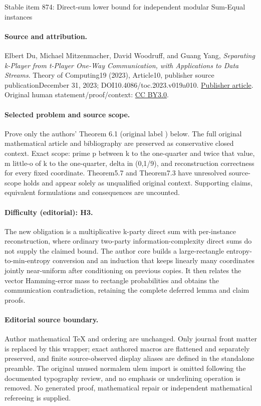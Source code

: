 \documentclass[11pt]{article}
\numberwithin{equation}{section}
\theoremstyle{definition}
\theoremstyle{plain}
\begin{document}
\begin{center}{\Large Stable item 874: Direct-sum lower bound for independent modular Sum-Equal instances}\end{center}
\paragraph{Source and attribution.}
Elbert Du, Michael Mitzenmacher, David Woodruff, and Guang Yang, \emph{Separating k-Player from t-Player One-Way Communication, with Applications to Data Streams}. Theory of Computing19 (2023), Article10, publisher source publicationDecember 31, 2023; DOI10.4086/toc.2023.v019a010. \href{https://theoryofcomputing.org/articles/v019a010/}{Publisher article}. Original human statement/proof/context: \href{https://creativecommons.org/licenses/by/3.0/}{CC BY3.0}.
\paragraph{Selected problem and source scope.}
Prove only the authors' Theorem 6.1 (original label ) below. The full original mathematical article and bibliography are preserved as conservative closed context. Exact scope: prime p between k to the one-quarter and twice that value, m little-o of k to the one-quarter, delta in (0,1/9), and reconstruction correctness for every fixed coordinate. Theorem5.7 and Theorem7.3 have unresolved source-scope holds and appear solely as unqualified original context. Supporting claims, equivalent formulations and consequences are uncounted.
\paragraph{Difficulty (editorial): H3.}
The new obligation is a multiplicative k-party direct sum with per-instance reconstruction, where ordinary two-party information-complexity direct sums do not supply the claimed bound. The author core builds a large-rectangle entropy-to-min-entropy conversion and an induction that keeps linearly many coordinates jointly near-uniform after conditioning on previous copies. It then relates the vector Hamming-error mass to rectangle probabilities and obtains the communication contradiction, retaining the complete deferred lemma and claim proofs.
\paragraph{Editorial source boundary.}
Author mathematical TeX and ordering are unchanged. Only journal front matter is replaced by this wrapper; exact authored macros are flattened and separately preserved, and finite source-observed display aliases are defined in the standalone preamble. The original unused normalem ulem import is omitted following the documented typography review, and no emphasis or underlining operation is removed. No generated proof, mathematical repair or independent mathematical refereeing is supplied. 
\clearpage
\end{document}
